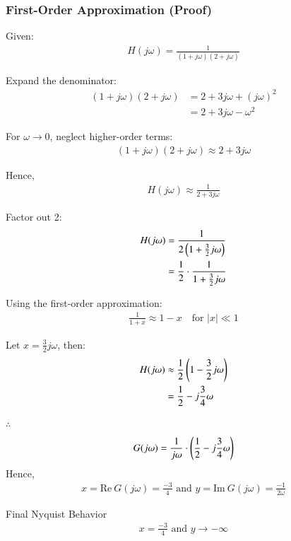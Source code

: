 \documentclass{beamer}
\begin{document}
\begin{frame}
\frametitle{First-Order Approximation (Proof)}

Given:
\begin{align}
H(j\omega) = \frac{1}{(1 + j\omega)(2 + j\omega)}
\end{align}

Expand the denominator:
\begin{align}
(1 + j\omega)(2 + j\omega) &= 2 + 3j\omega + (j\omega)^2 \\
&= 2 + 3j\omega - \omega^2
\end{align}

For $\omega \to 0$, neglect higher-order terms:
\begin{align}
(1 + j\omega)(2 + j\omega) \approx 2 + 3j\omega
\end{align}

Hence,
\begin{align}
H(j\omega) \approx \frac{1}{2 + 3j\omega}
\end{align}
\end{frame}
\begin{frame}
    
Factor out 2:
\begin{align}
H(j\omega) &= \frac{1}{2\left(1 + \frac{3}{2}j\omega\right)} \\
&= \frac{1}{2} \cdot \frac{1}{1 + \frac{3}{2}j\omega}
\end{align}

Using the first-order approximation:
\begin{align}
\frac{1}{1 + x} \approx 1 - x \quad \text{for } |x| \ll 1
\end{align}

Let $x = \frac{3}{2}j\omega$, then:
\begin{align}
H(j\omega) &\approx \frac{1}{2} \left(1 - \frac{3}{2}j\omega\right) \\
&= \frac{1}{2} - j\frac{3}{4}\omega
\end{align}

\end{frame}

\begin{frame}
    $\therefore$
    \begin{align}
        G(j\omega) = \frac{1}{j\omega}\cdot\left(\frac{1}{2} - j\frac{3}{4}\omega\right)
    \end{align}
    Hence, 
    \begin{align}
        x = \text{Re}\ G(j\omega) =  \frac{-3}{4} \text{ and } y = \text{Im}\ G(j\omega) = \frac{-1}{2\omega}
    \end{align}

    Final Nyquist Behavior 
    \begin{align}
        x = \frac{-3}{4} \text { and }  y \rightarrow -\infty 
    \end{align}
    
\end{frame}
\end{document}
